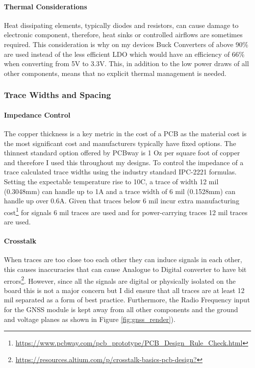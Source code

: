 \paragraph{Thermal Considerations}
Heat dissipating elements, typically diodes and resistors, can cause damage to electronic component, therefore, heat sinks or controlled airflows are sometimes required. This consideration is why on my devices Buck Converters of above 90\% are used instead of the less efficient \gls{LDO} which would have an efficiency of 66\% when converting from 5V to 3.3V. This, in addition to the low power draws of all other components, means that no explicit thermal management is needed.

\subsubsection{Trace Widths and Spacing}\label{sub_sub_section:tgt_trace_width}
\paragraph{Impedance Control}
The copper thickness is a key metric in the cost of a \gls{PCB} as the material cost is the most significant cost and manufacturers typically have fixed options. The thinnest standard option offered by PCBway is 1 Oz per square foot of copper and therefore I used this throughout my designs. To control the impedance of a trace calculated trace widths using the industry standard IPC-2221 formulas. Setting the expectable temperature rise to 10\degree C, a trace of width 12 mil (0.3048mm) can handle up to 1A and a trace width of 6 mil (0.1528mm) can handle up over 0.6A. Given that traces below 6 mil incur extra manufacturing cost\footnote{\url{https://www.pcbway.com/pcb_prototype/PCB_Design_Rule_Check.html}} for signals 6 mil traces are used and for power-carrying traces 12 mil traces are used.
\paragraph{Crosstalk}
When traces are too close too each other they can induce signals in each other, this causes inaccuracies that can cause Analogue to Digital converter to have bit errors\footnote{\url{https://resources.altium.com/p/crosstalk-basics-pcb-design?}}. However, since all the signals are digital or physically isolated on the board this is not a major concern but I did ensure that all traces are at least 12 mil separated as a form of best practice. Furthermore, the Radio Frequency input for the \gls{GNSS} module is kept away from all other components and the ground and voltage planes as shown in Figure \ref{fig:gnss_render}).

